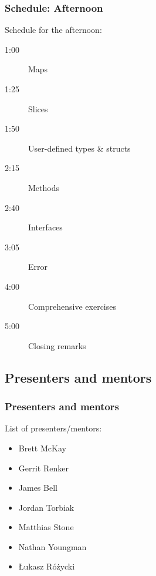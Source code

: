 \begin{frame}[t]
  \frametitle{Schedule: Afternoon}

  Schedule for the afternoon:

  \begin{description}
  \item[1:00] Maps
  \item[1:25] Slices
  \item[1:50] User-defined types \& structs
  \item[2:15] Methods
  \item[2:40] Interfaces
  \item[3:05] Error
  \item[4:00] Comprehensive exercises
  \item[5:00] Closing remarks
  \end{description}
\end{frame}

\subsection{Presenters and mentors}

\begin{frame}[t]
  \frametitle{Presenters and mentors}

  List of presenters/mentors:

  \begin{itemize}
  \item Brett McKay
  \item Gerrit Renker
  \item James Bell
  \item Jordan Torbiak
  \item Matthias Stone
  \item Nathan Youngman
  \item Łukasz Różycki
  \end{itemize}
\end{frame}

